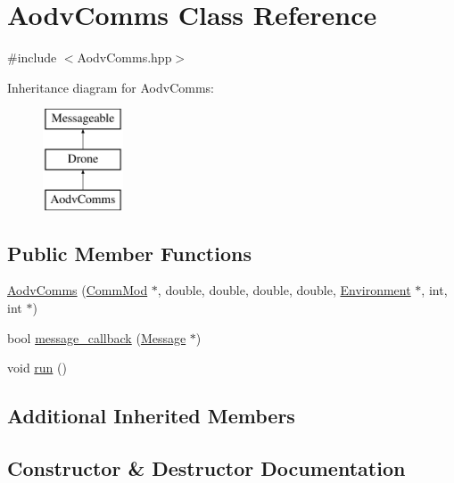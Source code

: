 \hypertarget{class_aodv_comms}{}\section{Aodv\+Comms Class Reference}
\label{class_aodv_comms}


{\ttfamily \#include $<$Aodv\+Comms.\+hpp$>$}

Inheritance diagram for Aodv\+Comms\+:\begin{figure}[H]
\begin{center}
\leavevmode
\includegraphics[height=3.000000cm]{class_aodv_comms}
\end{center}
\end{figure}
\subsection*{Public Member Functions}
\begin{DoxyCompactItemize}
\item 
\hyperlink{class_aodv_comms_a641debef992095bb2dec3aab1c2b302c}{Aodv\+Comms} (\hyperlink{class_comm_mod}{Comm\+Mod} $\ast$, double, double, double, double, \hyperlink{class_environment}{Environment} $\ast$, int, int $\ast$)
\item 
bool \hyperlink{class_aodv_comms_a88415cb9bf1c1afaf390763e4b77876b}{message\+\_\+callback} (\hyperlink{class_message}{Message} $\ast$)
\item 
void \hyperlink{class_aodv_comms_adbb3acdf25009338e22315ac6aa63f16}{run} ()
\end{DoxyCompactItemize}
\subsection*{Additional Inherited Members}


\subsection{Constructor \& Destructor Documentation}
